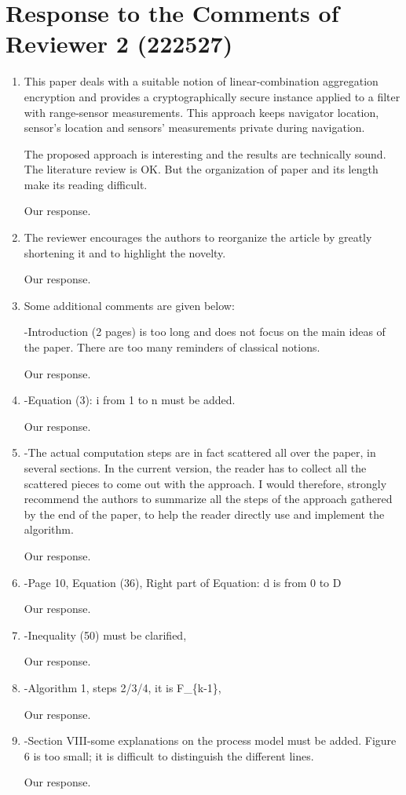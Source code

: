 \documentclass[a4paper]{scrartcl}
\newenvironment{rebuttal}{\begin{enumerate}[label={\color{grey}\thesection.\arabic{enumi}},leftmargin=0pt,ref=\thesection.\arabic{enumi}]}{\end{enumerate}}
\newcommand{\reviewtext}[1]{{\color{nblue} #1}}
\begin{document}
\section*{Response to the Comments of Reviewer 2 (222527)}
\def\thesection{R2}
\begin{rebuttal}
\item \reviewtext{This paper deals with a suitable notion of linear-combination aggregation encryption and provides a cryptographically secure instance applied to a filter with range-sensor measurements. This approach keeps navigator location, sensor's location and sensors' measurements private during navigation.

The proposed approach is interesting and the results are technically sound. The literature review is OK. But the organization of paper and its length make its reading difficult.}

Our response.

\item \reviewtext{The reviewer encourages the authors to reorganize the article by greatly shortening it and to highlight the novelty.}

Our response.

\item \reviewtext{Some additional comments are given below:

-Introduction (2 pages) is too long and does not focus on the main ideas of the paper. There are too many reminders of classical notions.}

Our response.

\item \reviewtext{-Equation (3): i from 1 to n must be added.}

Our response.

\item \reviewtext{-The actual computation steps are in fact scattered all over the paper, in several sections.  In the current version, the reader has to collect all the scattered pieces to come out with the approach. I would therefore, strongly recommend the authors to summarize all the steps of the approach gathered by the end of the paper, to help the reader directly use and implement the algorithm.}

Our response.

\item \reviewtext{-Page 10, Equation (36), Right part of Equation: d is from 0 to D}

Our response.

\item \reviewtext{-Inequality (50) must be clarified,}

Our response.

\item \reviewtext{-Algorithm 1, steps 2/3/4, it is F\_\{k-1\},}

Our response.

\item \reviewtext{-Section VIII-some explanations on the process model must be added. Figure 6 is too small; it is difficult to distinguish the different lines.}

Our response.

\end{rebuttal}
\end{document}
